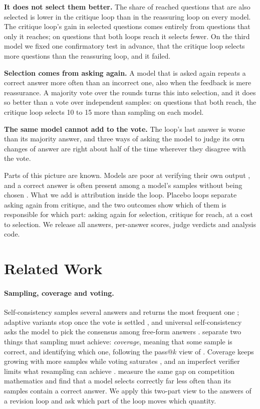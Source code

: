 \documentclass[11pt]{article}
\begin{document}
\textbf{It does not select them better.}
The share of reached questions that are also selected is lower in the critique loop than in the reassuring loop on every model.
The critique loop's gain in selected questions comes entirely from questions that only it reaches; on questions that both loops reach it selects fewer.
On the third model we fixed one confirmatory test in advance, that the critique loop selects more questions than the reassuring loop, and it failed.

\textbf{Selection comes from asking again.}
A model that is asked again repeats a correct answer more often than an incorrect one, also when the feedback is mere reassurance.
A majority vote over the rounds turns this into selection, and it does so better than a vote over independent samples: on questions that both reach, the critique loop selects 10 to 15 more than sampling on each model.

\textbf{The same model cannot add to the vote.}
The loop's last answer is worse than its majority answer, and three ways of asking the model to judge its own changes of answer are right about half of the time wherever they disagree with the vote.

Parts of this picture are known.
Models are poor at verifying their own output \citep{huang2024cannot,stechly2024selfverification,song2024mindgap}, and a correct answer is often present among a model's samples without being chosen \citep{brown2024monkeys,jain2026cliff}.
What we add is attribution inside the loop.
Placebo loops separate asking again from critique, and the two outcomes show which of them is responsible for which part: asking again for selection, critique for reach, at a cost to selection.
We release all answers, per-answer scores, judge verdicts and analysis code.

\section{Related Work}

\paragraph{Sampling, coverage and voting.}
Self-consistency samples several answers and returns the most frequent one \citep{wang2023selfconsistency}; adaptive variants stop once the vote is settled \citep{aggarwal2023adaptive}, and universal self-consistency asks the model to pick the consensus among free-form answers \citep{chen2023usc}.
\citet{brown2024monkeys} separate two things that sampling must achieve: \emph{coverage}, meaning that some sample is correct, and identifying which one, following the pass@$k$ view of \citet{chen2021codex}.
Coverage keeps growing with more samples while voting saturates \citep{brown2024monkeys,chen2024morecalls}, and an imperfect verifier limits what resampling can achieve \citep{stroebl2024flaws}.
\citet{jain2026cliff} measure the same gap on competition mathematics and find that a model selects correctly far less often than its samples contain a correct answer.
We apply this two-part view to the answers of a revision loop and ask which part of the loop moves which quantity.
\end{document}
